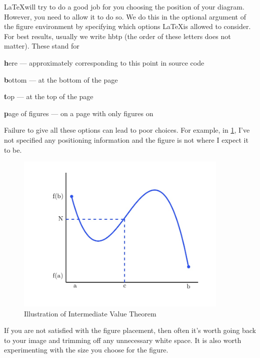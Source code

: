 \documentclass[a4paper,11pt]{article}
\begin{document}
\LaTeX will try to do a good job for you choosing the position of your diagram. However, you need to allow it to do so.  We do this in the optional argument of the figure environment by specifying which options \LaTeX is allowed to consider. For best results, usually we write hbtp (the order of these letters does not matter). These stand for
\begin{description}
\item{\textbf{h}ere} --- approximately corresponding to this point in  source code
\item{\textbf{b}ottom}  --- at the bottom of the page
\item{\textbf{t}op} --- at the top of the page
\item{\textbf{p}age of figures} --- on a page with only figures on
\end{description}

Failure to give all these options can lead to poor choices. For example, in \ref{fig:IVTnoposition}, I've not specified any positioning information and the figure is not where I expect it to be.
%
\begin{figure}
	\centering %
	\includegraphics[width=4in]{IVT.jpg} %
	\caption{Illustration of Intermediate Value Theorem}
	\label{fig:IVTnoposition}
\end{figure}
%

If you are not satisfied with the figure  placement, then often it's worth going back to your image and trimming off any unnecessary white space. It is also worth experimenting  with the size you choose for the figure.
\end{document}
